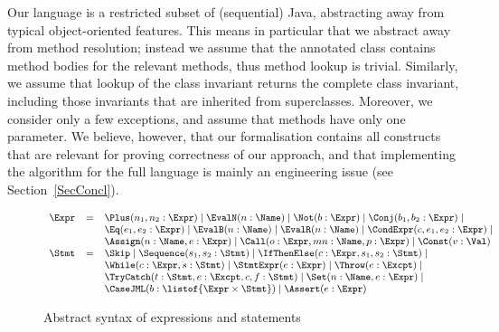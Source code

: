 Our language is a restricted subset of (sequential) Java, abstracting
away from typical object-oriented features. This means in particular
that we abstract away from method resolution; instead we assume that
the annotated class contains method bodies for the relevant methods,
thus method lookup is trivial. Similarly, we assume that lookup of the
class invariant returns the complete class invariant, including those
invariants that are inherited from superclasses. Moreover, we consider
only a few exceptions, and assume that methods have only one
parameter. We believe, however, that our formalisation contains all
constructs that are relevant for proving correctness of our approach,
and that implementing the algorithm for the full language is mainly an
engineering issue (see Section~\ref{SecConcl}).

\begin{figure}[t]
\[{\small
\begin{array}{rcl}
\Expr & = & \Plus(n_1, n_2 : \Expr) \mid
            \EvalN(n : \Name) \mid
            \Not(b : \Expr) \mid
            \Conj(b_1, b_2 : \Expr) \mid \\
      &   & \Eq(e_1, e_2 : \Expr) \mid
            \EvalB(n : \Name) \mid
            \EvalR(n : \Name) \mid
            \CondExpr(c, e_1, e_2 : \Expr) \mid\\
      &   & \Assign(n : \Name, e : \Expr) \mid
            \Call(o : \Expr, mn : \Name, p : \Expr) \mid
            \Const(v : \Val) \\
\Stmt & = & \Skip \mid
            \Sequence(s_1, s_2 : \Stmt) \mid
            \IfThenElse(c : \Expr, s_1, s_2 : \Stmt) \mid\\
      &   & \While(c : \Expr, s : \Stmt) \mid
            \StmtExpr(e : \Expr) \mid
            \Throw(e : \Excpt) \mid\\
      &   & \TryCatch(t: \Stmt, e : \Excpt, c, f : \Stmt) \mid
            \Set(n : \Name, e : \Expr) \mid\\
      &   & \CaseJML(b : \listof{\Expr \times \Stmt}) \mid
            \Assert(e : \Expr)
\end{array}}
\]
\caption{Abstract syntax of expressions and statements}
\label{FigExprStmt}
\end{figure}

